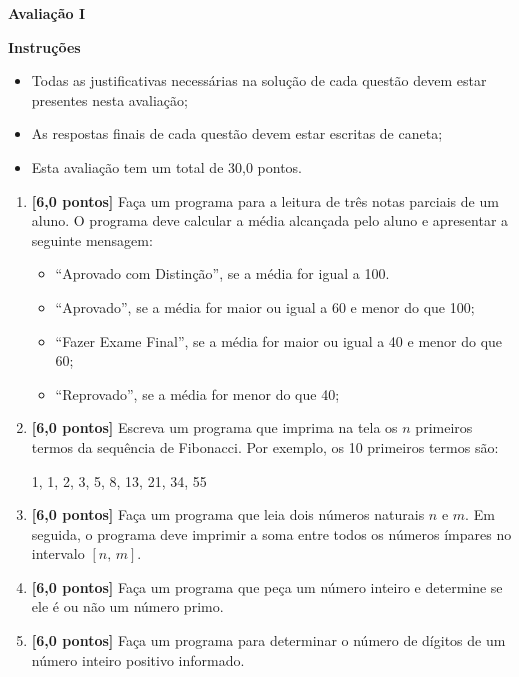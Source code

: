 \documentclass[12pt,a4paper]{article}
\begin{document}
\begin{center}
 \textbf{Avaliação I}
\end{center}

\textbf{Instruções}
\begin{itemize}
 \item Todas as justificativas necessárias na solução de cada questão devem 
 estar presentes nesta avaliação;
 \item As respostas finais de cada questão devem estar escritas de caneta;
 \item Esta avaliação tem um total de 30,0 pontos.
\end{itemize}

\begin{enumerate}
  \item \textbf{[6,0 pontos]} Faça um programa para a leitura de três notas parciais de um aluno.
  O programa deve calcular a média alcançada pelo aluno e apresentar a seguinte mensagem:
    \begin{itemize}
      \item ``Aprovado com Distinção'', se a média for igual a 100.
      \item ``Aprovado'', se a média for maior ou igual a 60 e menor do que 100;
      \item ``Fazer Exame Final'', se a média for maior ou igual a 40 e menor do que 60;
      \item ``Reprovado'', se a média for menor do que 40;
    \end{itemize}
  
  \item \textbf{[6,0 pontos]} Escreva um programa que imprima na tela os $n$ primeiros termos
  da sequência de Fibonacci. Por exemplo, os 10 primeiros termos são:
  
  \begin{center}
    1, 1, 2, 3, 5, 8, 13, 21, 34, 55
  \end{center}
  
  \item \textbf{[6,0 pontos]} Faça um programa que leia dois números naturais $n$ e $m$.
  Em seguida, o programa deve imprimir a soma entre todos os números ímpares no intervalo
  $[n,\, m]$.

  \item \textbf{[6,0 pontos]} Faça um programa que peça um número inteiro e determine se
  ele é ou não um número primo.

  \item \textbf{[6,0 pontos]} Faça um programa para determinar o número de dígitos
  de um número inteiro positivo informado.

\end{enumerate}
\end{document}
